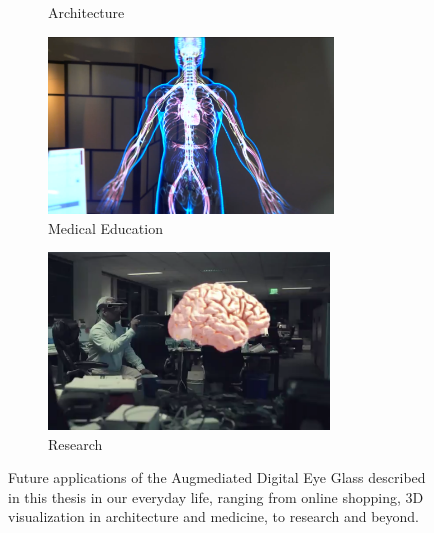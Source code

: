 \begin{figure}
\begin{subfigure}[b]{3.0in}
  \caption{Architecture}
  \label{fig:architecture}
\end{subfigure}
\begin{subfigure}[b]{3.0in}
\centering
  \includegraphics[height=1.85in]{ch7/figures/future/medical.png} 
  \caption{Medical Education}
  \label{fig:m_education}
\end{subfigure}
\begin{subfigure}[b]{3.0in}
\centering
  \includegraphics[height=1.85in]{ch7/figures/future/education.png} 
  \caption{Research}
  \label{fig:education}
\end{subfigure}
\caption{Future applications of the Augmediated Digital Eye Glass described in this thesis in our everyday life, ranging from online shopping, 3D visualization in architecture and medicine, to research and beyond.}
\label{fig:futureAR}
\end{figure}


